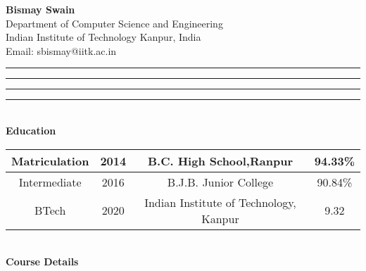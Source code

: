 \documentclass[a4paper, 11pt]{article}
\begin{document}
\noindent
\textbf{Bismay Swain}
\\Department of Computer Science and Engineering
\\Indian Institute of Technology Kanpur, India
\\Email: sbismay@iitk.ac.in
\vspace{0.5cm}
\hrule
\vspace{0.1cm}
\hrule
\vspace{0.3cm}
\noindent
\lipsum[12]
\vspace{0.1cm}
\hrule
\vspace{0.1cm}
\hrule
\vspace{0.3cm}
\noindent
\\{\bf Education}\\

\noindent
\vspace{1cm}
\begin{tabular}{|c|c|c|c|}
  \hline
  Matriculation & 2014 & B.C. High School,Ranpur & 94.33\%\\
  \hline
  Intermediate & 2016 & B.J.B. Junior College & 90.84\%\\
  \hline
  BTech & 2020 & Indian Institute of Technology, Kanpur & 9.32\\
  \hline
\end{tabular}
\\{\bf Course Details}\\
\end{document}
